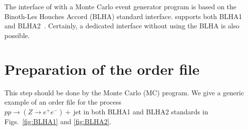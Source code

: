 The interface of \gosam with a Monte Carlo event generator program 
is based on the Binoth-Les Houches Accord (BLHA)
standard interface.
\gosamv supports both BLHA1~\cite{Binoth:2010xt}
and BLHA2~\cite{Alioli:2013nda}.
Certainly, a dedicated interface without using the BLHA is also possible.


\section{Preparation of the order file}
This step should be done by the Monte Carlo (MC) program. 
We give a generic example of an order file for the process \\
$pp\to (Z\to e^+e^-)+$\,jet in both BLHA1 and BLHA2 standards 
in Figs.~\ref{fig:BLHA1} and \ref{fig:BLHA2}.
\begin{figure}[htb!]
\begin{subfigure}[]{0.49\textwidth}
\centering
{}
\end{subfigure}
\begin{subfigure}[]{0.49\textwidth}
\centering
{}
\end{subfigure}
\end{figure}
